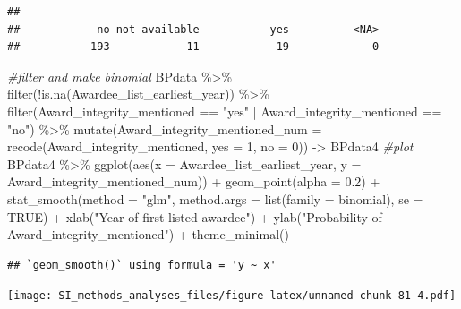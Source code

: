 \documentclass[
]{article}
\newenvironment{Shaded}{\begin{snugshade}}{\end{snugshade}}
\newcommand{\AttributeTok}[1]{\textcolor[rgb]{0.77,0.63,0.00}{#1}}
\newcommand{\CommentTok}[1]{\textcolor[rgb]{0.56,0.35,0.01}{\textit{#1}}}
\newcommand{\ConstantTok}[1]{\textcolor[rgb]{0.00,0.00,0.00}{#1}}
\newcommand{\DecValTok}[1]{\textcolor[rgb]{0.00,0.00,0.81}{#1}}
\newcommand{\FloatTok}[1]{\textcolor[rgb]{0.00,0.00,0.81}{#1}}
\newcommand{\FunctionTok}[1]{\textcolor[rgb]{0.00,0.00,0.00}{#1}}
\newcommand{\NormalTok}[1]{#1}
\newcommand{\OtherTok}[1]{\textcolor[rgb]{0.56,0.35,0.01}{#1}}
\newcommand{\SpecialCharTok}[1]{\textcolor[rgb]{0.00,0.00,0.00}{#1}}
\newcommand{\StringTok}[1]{\textcolor[rgb]{0.31,0.60,0.02}{#1}}
\begin{document}
\begin{verbatim}
## 
##            no not available           yes          <NA> 
##           193            11            19             0
\end{verbatim}

\begin{Shaded}
\begin{Highlighting}[]
\CommentTok{\#filter and make binomial }
\NormalTok{BPdata }\SpecialCharTok{\%\textgreater{}\%} 
  \FunctionTok{filter}\NormalTok{(}\SpecialCharTok{!}\FunctionTok{is.na}\NormalTok{(Awardee\_list\_earliest\_year)) }\SpecialCharTok{\%\textgreater{}\%} 
  \FunctionTok{filter}\NormalTok{(Award\_integrity\_mentioned }\SpecialCharTok{==} \StringTok{"yes"} \SpecialCharTok{|}\NormalTok{ Award\_integrity\_mentioned }\SpecialCharTok{==} \StringTok{"no"}\NormalTok{) }\SpecialCharTok{\%\textgreater{}\%}  
  \FunctionTok{mutate}\NormalTok{(}\AttributeTok{Award\_integrity\_mentioned\_num =} \FunctionTok{recode}\NormalTok{(Award\_integrity\_mentioned, }\AttributeTok{yes =} \DecValTok{1}\NormalTok{, }\AttributeTok{no =} \DecValTok{0}\NormalTok{)) }\OtherTok{{-}\textgreater{}}\NormalTok{ BPdata4}
\CommentTok{\#plot}
\NormalTok{BPdata4 }\SpecialCharTok{\%\textgreater{}\%} 
  \FunctionTok{ggplot}\NormalTok{(}\FunctionTok{aes}\NormalTok{(}\AttributeTok{x =}\NormalTok{ Awardee\_list\_earliest\_year, }\AttributeTok{y =}\NormalTok{ Award\_integrity\_mentioned\_num)) }\SpecialCharTok{+} 
  \FunctionTok{geom\_point}\NormalTok{(}\AttributeTok{alpha =} \FloatTok{0.2}\NormalTok{) }\SpecialCharTok{+} 
  \FunctionTok{stat\_smooth}\NormalTok{(}\AttributeTok{method =} \StringTok{"glm"}\NormalTok{, }\AttributeTok{method.args =} \FunctionTok{list}\NormalTok{(}\AttributeTok{family =}\NormalTok{ binomial), }\AttributeTok{se =} \ConstantTok{TRUE}\NormalTok{) }\SpecialCharTok{+}
  \FunctionTok{xlab}\NormalTok{(}\StringTok{"Year of first listed awardee"}\NormalTok{) }\SpecialCharTok{+} 
  \FunctionTok{ylab}\NormalTok{(}\StringTok{"Probability of Award\_integrity\_mentioned"}\NormalTok{) }\SpecialCharTok{+}
  \FunctionTok{theme\_minimal}\NormalTok{()}
\end{Highlighting}
\end{Shaded}

\begin{verbatim}
## `geom_smooth()` using formula = 'y ~ x'
\end{verbatim}

\texttt{[image: SI\_methods\_analyses\_files/figure-latex/unnamed-chunk-81-4.pdf]}
\end{document}
